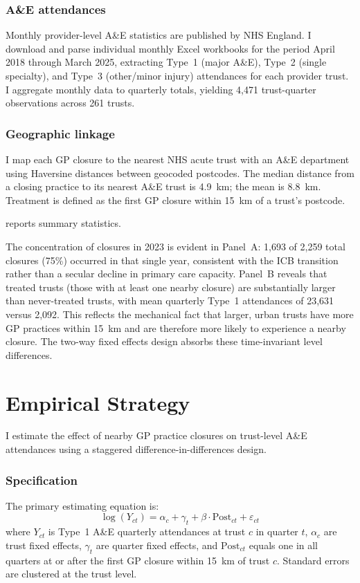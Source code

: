 \documentclass[12pt]{article}
\begin{document}
\subsubsection*{A\&E attendances} Monthly provider-level A\&E statistics are published by NHS England. I download and parse individual monthly Excel workbooks for the period April 2018 through March 2025, extracting Type~1 (major A\&E), Type~2 (single specialty), and Type~3 (other/minor injury) attendances for each provider trust. I aggregate monthly data to quarterly totals, yielding 4,471 trust-quarter observations across 261 trusts.

\subsubsection*{Geographic linkage} I map each GP closure to the nearest NHS acute trust with an A\&E department using Haversine distances between geocoded postcodes. The median distance from a closing practice to its nearest A\&E trust is 4.9~km; the mean is 8.8~km. Treatment is defined as the first GP closure within 15~km of a trust's postcode.

 reports summary statistics.



The concentration of closures in 2023 is evident in Panel~A: 1,693 of 2,259 total closures (75\%) occurred in that single year, consistent with the ICB transition rather than a secular decline in primary care capacity. Panel~B reveals that treated trusts (those with at least one nearby closure) are substantially larger than never-treated trusts, with mean quarterly Type~1 attendances of 23,631 versus 2,092. This reflects the mechanical fact that larger, urban trusts have more GP practices within 15~km and are therefore more likely to experience a nearby closure. The two-way fixed effects design absorbs these time-invariant level differences.

\section{Empirical Strategy}
\label{sec:strategy}

I estimate the effect of nearby GP practice closures on trust-level A\&E attendances using a staggered difference-in-differences design.

\subsubsection*{Specification} The primary estimating equation is:
\begin{equation}
\log(Y_{ct}) = \alpha_c + \gamma_t + \beta \cdot \text{Post}_{ct} + \varepsilon_{ct}
\label{eq:twfe}
\end{equation}
where $Y_{ct}$ is Type~1 A\&E quarterly attendances at trust $c$ in quarter $t$, $\alpha_c$ are trust fixed effects, $\gamma_t$ are quarter fixed effects, and $\text{Post}_{ct}$ equals one in all quarters at or after the first GP closure within 15~km of trust $c$. Standard errors are clustered at the trust level.
\end{document}
